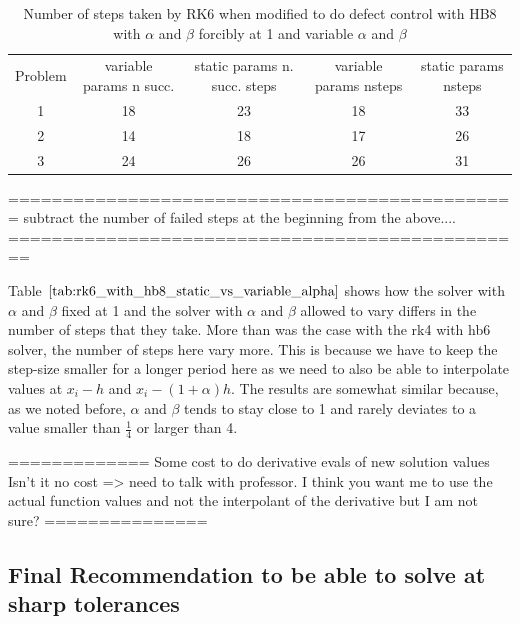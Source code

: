 \documentclass{article}
\begin{document}
\begin{table}[h]
\caption {Number of steps taken by RK6 when modified to do defect control with HB8 with $\alpha$ and $\beta$ forcibly at 1 and variable $\alpha$ and $\beta$} \label{tab:rk6_with_hb6_vs_hb8_static_vs_variable}
\begin{center}
\begin{tabular}{ c c c c c } 
Problem & variable params n succ. & static params n. succ. steps & variable params nsteps & static params nsteps \\ 
1       & 18                      &        23               & 18         & 33\\ 
2       & 14                      &        18               & 17         & 26\\
3       & 24                      &        26               & 26         & 31\\
\end{tabular}
\end{center}
\end{table}	

===============================================
subtract the number of failed steps at the beginning from the above....
================================================

Table $\ref{tab:rk6_with_hb8_static_vs_variable_alpha}$ shows how the solver with $\alpha$ and $\beta$ fixed at 1 and the solver with $\alpha$ and $\beta$ allowed to vary differs in the number of steps that they take. More than was the case with the rk4 with hb6 solver, the number of steps here vary more. This is because we have to keep the step-size smaller for a longer period here as we need to also be able to interpolate values at $x_i - h$ and $x_i - (1+\alpha)h$. The results are somewhat similar because, as we noted before, $\alpha$ and $\beta$ tends to stay close to 1 and rarely deviates to a value smaller than $\frac{1}{4}$ or larger than 4.


	
=============
Some cost to do derivative evals of new solution values
Isn't it no cost => need to talk with professor.
I think you want me to use the actual function values and not the interpolant of the derivative but I am not sure?
===============

\subsection{Final Recommendation to be able to solve at sharp tolerances}
\label{section:HBs_higher_tol}
\end{document}
